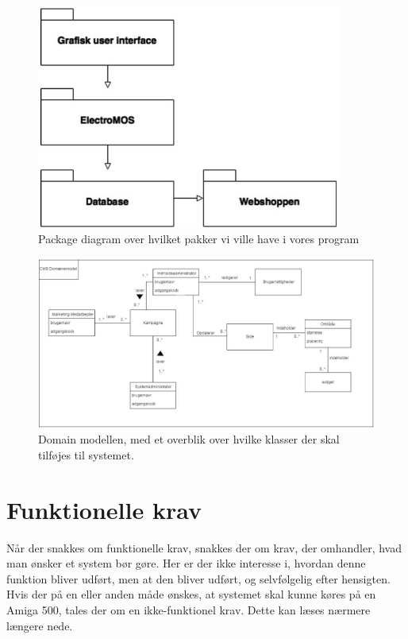\begin{figure}[ht]
	\includegraphics[width=10cm]{inceptionsdokumentet/figurer/Inception-Pakkediagram.JPG}
    \caption{Package diagram over hvilket pakker vi ville have i vores program}
    \label{Inception Pakkediagram}
\end{figure}

\begin{figure}[ht]
	\includegraphics[angle=270, width=\linewidth]{inceptionsdokumentet/figurer/Inception-Domainmodel.JPG}
    \caption{Domain modellen, med et overblik over hvilke klasser der skal tilføjes til systemet.}
    \label{Inception Domainmodel}
\end{figure}

\FloatBarrier

\section{Funktionelle krav}
Når der snakkes om funktionelle krav, snakkes der om krav, der omhandler, hvad man ønsker et system bør gøre. Her er der ikke interesse i, hvordan denne funktion bliver udført, men at den bliver udført, og selvfølgelig efter hensigten. Hvis der på en eller anden måde ønskes, at systemet skal kunne køres på en Amiga 500, tales der om en ikke-funktionel krav. Dette kan læses nærmere længere nede.

